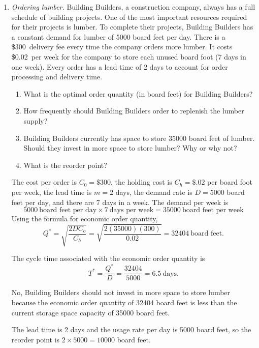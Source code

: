\begin{enumerate}
\item \emph{Ordering lumber.}  Building Builders, a construction
  company, always has a full schedule of building projects.  One of
  the most important resources required for their projects is
  lumber. To complete their projects, Building Builders has a constant
  demand for lumber of \num{5000} board feet per day.  There is a
  \$300\ delivery fee every time the company orders more lumber. It
  costs \$0.02\ per week for the company to store each unused board
  foot (7 days in one week). Every order has a lead time of 2 days to
  account for order processing and delivery time.

\begin{enumerate}
\item What is the optimal order quantity (in board feet) for Building
  Builders?
\item How frequently should Building Builders order to replenish the
  lumber supply?
\item Building Builders currently has space to store \num{35000} board
  feet of lumber. Should they invest in more space to store lumber?
  Why or why not?
\item What is the reorder point?
\end{enumerate}

\begin{solution}
  \bs The cost per order is $C_0=\$300$, the holding cost is
  $C_h=\$.02$ per board foot per week, the lead time is $m=2$ days,
  the demand rate is $D=\num{5000}$ board feet per day, and there are
  7 days in a week.  The demand per week is
  \[\num{5000} ~\text{board feet per day} \times 7 ~\text{days per
      week} = \num{35000} ~\text{board feet per week}\] Using the
  formula for economic order quantity,
\[ Q^{\ast} = \sqrt{\frac{2DC_o}{C_h}} = \sqrt{\frac{2(\num{35000})(300)}{0.02}} = \num{32404}~\text{board feet.} \]

The cycle time associated with the economic order quantity is
\[ T^{\ast} = \frac{Q^{\ast}}{D} = \frac{\num{32404}}{\num{5000}} = 6.5 ~\text{days.} \]

No, Building Builders should not invest in more space to store lumber
because the economic order quantity of \num{32404} board feet is less
than the current storage space capacity of \num{35000} board feet.

The lead time is 2 days and the usage rate per day is \num{5000} board
feet, so the reorder point is $2 \times \num{5000} = \num{10000}$
board feet.
\end{solution}


\end{enumerate}
